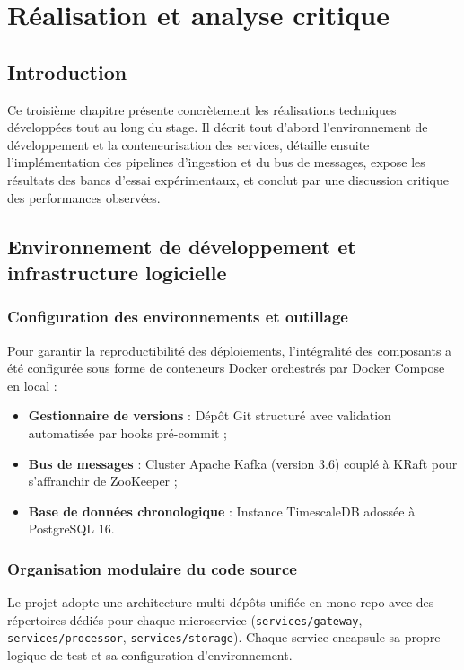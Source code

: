 \chapter{R\'ealisation et analyse critique}
\finPageTitre

\section{Introduction}
Ce troisi\`eme chapitre pr\'esente concr\`etement les r\'ealisations techniques d\'evelopp\'ees tout au long du stage. Il d\'ecrit tout d'abord l'environnement de d\'eveloppement et la conteneurisation des services, d\'etaille ensuite l'impl\'ementation des pipelines d'ingestion et du bus de messages, expose les r\'esultats des bancs d'essai exp\'erimentaux, et conclut par une discussion critique des performances observ\'ees.

\section{Environnement de d\'eveloppement et infrastructure logicielle}
\subsection{Configuration des environnements et outillage}
Pour garantir la reproductibilit\'e des d\'eploiements, l'int\'egralit\'e des composants a \'et\'e configur\'ee sous forme de conteneurs Docker orchestr\'es par Docker Compose en local :
\begin{itemize}
    \item \textbf{Gestionnaire de versions} : D\'ep\^ot Git structur\'e avec validation automatis\'ee par hooks pr\'e-commit ;
    \item \textbf{Bus de messages} : Cluster Apache Kafka (version 3.6) coupl\'e \`a KRaft pour s'affranchir de ZooKeeper ;
    \item \textbf{Base de donn\'ees chronologique} : Instance TimescaleDB adoss\'ee \`a PostgreSQL 16.
\end{itemize}

\subsection{Organisation modulaire du code source}
Le projet adopte une architecture multi-d\'ep\^ots unifi\'ee en mono-repo avec des r\'epertoires d\'edi\'es pour chaque microservice (\texttt{services/gateway}, \texttt{services/processor}, \texttt{services/storage}). Chaque service encapsule sa propre logique de test et sa configuration d'environnement.

